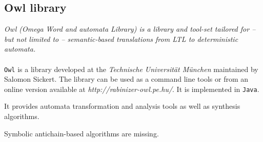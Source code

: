 \documentclass[letterpaper]{article}
\theoremstyle{definition}
\begin{document}
%
%
%

\subsection{Owl library}

\label{sec:owl}

\textit{Owl (Omega Word and automata Library)
is a library and tool-set tailored for – but not
limited to – semantic-based translations
from LTL to deterministic automata.}

\paragraph{}

\texttt{Owl} is a library developed at the
\textit{Technische Universität München}
maintained by Salomon Sickert.
The library can be used as a command line tools or from an
online version available at \textit{http://rabinizer-owl.pe.hu/}.
It is implemented in \texttt{Java}.


It provides automata transformation and analysis
tools as well as synthesis algorithms.

Symbolic antichain-based algorithms are missing.

\end{document}
